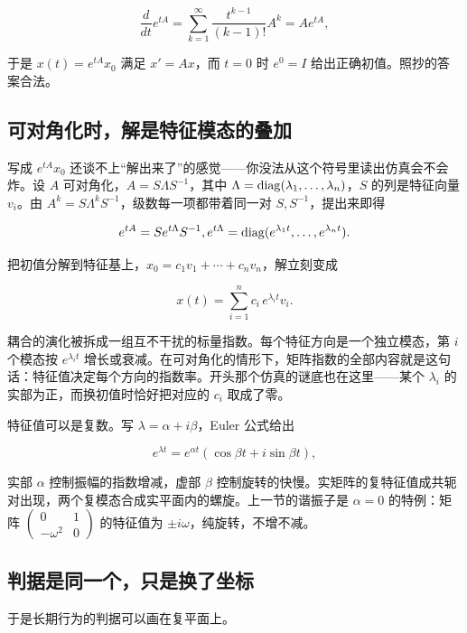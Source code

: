 \[
\frac{d}{dt}e^{tA}
=\sum_{k=1}^{\infty}\frac{t^{k-1}}{(k-1)!}A^k
=Ae^{tA},
\]

于是 \(x(t)=e^{tA}x_0\) 满足 \(x'=Ax\)，而 \(t=0\) 时 \(e^{0}=I\) 给出正确初值。照抄的答案合法。

\subsection{可对角化时，解是特征模态的叠加}

写成 \(e^{tA}x_0\) 还谈不上``解出来了''的感觉——你没法从这个符号里读出仿真会不会炸。设 \(A\) 可对角化，\(A=S\Lambda S^{-1}\)，其中 \(\Lambda=\operatorname{diag}(\lambda_1,\ldots,\lambda_n)\)，\(S\) 的列是特征向量 \(v_i\)。由 \(A^k=S\Lambda^kS^{-1}\)，级数每一项都带着同一对 \(S,S^{-1}\)，提出来即得

\[
e^{tA}=Se^{t\Lambda}S^{-1},
\space
e^{t\Lambda}=\operatorname{diag}(e^{\lambda_1t},\ldots,e^{\lambda_nt}).
\]

把初值分解到特征基上，\(x_0=c_1v_1+\cdots+c_nv_n\)，解立刻变成

\[
x(t)=\sum_{i=1}^{n}c_i\,e^{\lambda_it}v_i.
\]

耦合的演化被拆成一组互不干扰的标量指数。每个特征方向是一个独立模态，第 \(i\) 个模态按 \(e^{\lambda_it}\) 增长或衰减。在可对角化的情形下，矩阵指数的全部内容就是这句话：特征值决定每个方向的指数率。开头那个仿真的谜底也在这里——某个 \(\lambda_i\) 的实部为正，而换初值时恰好把对应的 \(c_i\) 取成了零。

特征值可以是复数。写 \(\lambda=\alpha+i\beta\)，Euler 公式给出

\[
e^{\lambda t}=e^{\alpha t}(\cos\beta t+i\sin\beta t),
\]

实部 \(\alpha\) 控制振幅的指数增减，虚部 \(\beta\) 控制旋转的快慢。实矩阵的复特征值成共轭对出现，两个复模态合成实平面内的螺旋。上一节的谐振子是 \(\alpha=0\) 的特例：矩阵 \(\begin{pmatrix}0&1\\-\omega^2&0\end{pmatrix}\) 的特征值为 \(\pm i\omega\)，纯旋转，不增不减。

\subsection{判据是同一个，只是换了坐标}

于是长期行为的判据可以画在复平面上。


